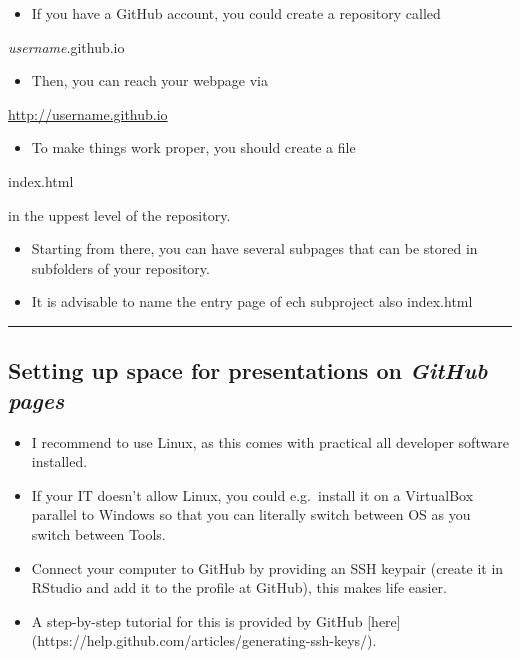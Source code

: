 
\begin{itemize}
\tightlist
\item
  If you have a GitHub account, you could create a repository called
\end{itemize}

\emph{username}.github.io

\begin{itemize}
\tightlist
\item
  Then, you can reach your webpage via
\end{itemize}

\url{http://username.github.io}

\begin{itemize}
\tightlist
\item
  To make things work proper, you should create a file
\end{itemize}

index.html

in the uppest level of the repository.

\begin{itemize}
\item
  Starting from there, you can have several subpages that can be stored
  in subfolders of your repository.
\item
  It is advisable to name the entry page of ech subproject also
  index.html
\end{itemize}

\begin{center}\rule{0.5\linewidth}{\linethickness}\end{center}

\subsection{\texorpdfstring{Setting up space for presentations on
\emph{GitHub
pages}}{Setting up space for presentations on GitHub pages}}\label{setting-up-space-for-presentations-on-github-pages}

\begin{itemize}
\item
  I recommend to use Linux, as this comes with practical all developer
  software installed.
\item
  If your IT doesn't allow Linux, you could e.g.~install it on a
  VirtualBox parallel to Windows so that you can literally switch
  between OS as you switch between Tools.
\item
  Connect your computer to GitHub by providing an SSH keypair (create it
  in RStudio and add it to the profile at GitHub), this makes life
  easier.
\item
  A step-by-step tutorial for this is provided by GitHub {[}here{]}
  (https://help.github.com/articles/generating-ssh-keys/).
\end{itemize}

